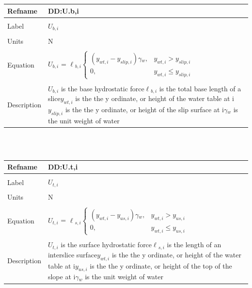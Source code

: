 \documentclass[12pt]{article}
\begin{document}
\noindent \begin{minipage}{\textwidth}
\begin{tabular}{p{} p{}}
\toprule \textbf{Refname} & \textbf{DD:U.b,i}
\label{DD:U.b,i}
\\ \midrule \\
Label & $U_{b,i}$
\\ \midrule \\
Units & N
\\ \midrule \\
Equation & $U_{b,i}$ = $\ell{}_{b,i}\begin{cases}
\left(y_{wt,i}-y_{slip,i}\right)\gamma{}_{w}, & y_{wt,i}>y_{slip,i}\\
0, & y_{wt,i}\leq{}y_{slip,i}
\end{cases}$
\\ \midrule \\
Description & $U_{b,i}$ is the base hydrostatic force\newline$\ell{}_{b,i}$ is the total base length of a slice\newline$y_{wt,i}$ is the the y ordinate, or height of the water table at i\newline$y_{slip,i}$ is the the y ordinate, or height of the slip surface at i\newline$\gamma{}_{w}$ is the unit weight of water
\\ \bottomrule \end{tabular}
\end{minipage}\\
~\newline
\noindent \begin{minipage}{\textwidth}
\begin{tabular}{p{} p{}}
\toprule \textbf{Refname} & \textbf{DD:U.t,i}
\label{DD:U.t,i}
\\ \midrule \\
Label & $U_{t,i}$
\\ \midrule \\
Units & N
\\ \midrule \\
Equation & $U_{t,i}$ = $\ell{}_{s,i}\begin{cases}
\left(y_{wt,i}-y_{us,i}\right)\gamma{}_{w}, & y_{wt,i}>y_{us,i}\\
0, & y_{wt,i}\leq{}y_{us,i}
\end{cases}$
\\ \midrule \\
Description & $U_{t,i}$ is the surface hydrostatic force\newline$\ell{}_{s,i}$ is the length of an interslice surface\newline$y_{wt,i}$ is the the y ordinate, or height of the water table at i\newline$y_{us,i}$ is the the y ordinate, or height of the top of the slope at i\newline$\gamma{}_{w}$ is the unit weight of water
\\ \bottomrule \end{tabular}
\end{minipage}\\
\end{document}
